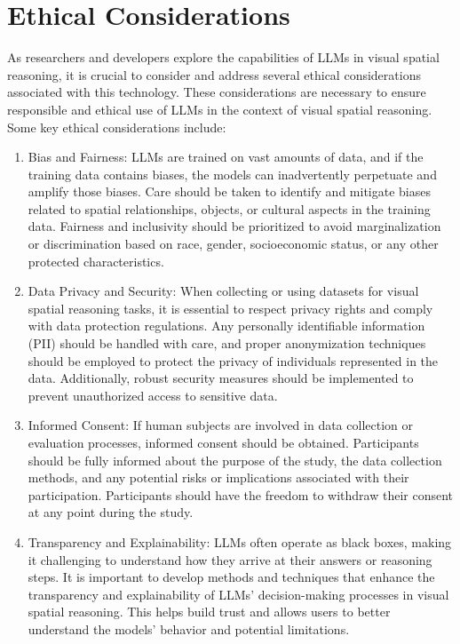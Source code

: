 \documentclass[journal,10pt]{IEEEtran}
\begin{document}
\section{Ethical Considerations}
As researchers and developers explore the capabilities of LLMs in visual spatial reasoning, it is crucial to consider and address several ethical considerations associated with this technology. These considerations are necessary to ensure responsible and ethical use of LLMs in the context of visual spatial reasoning. Some key ethical considerations include:
\begin{enumerate}
    \item Bias and Fairness: LLMs are trained on vast amounts of data, and if the training data contains biases, the models can inadvertently perpetuate and amplify those biases. Care should be taken to identify and mitigate biases related to spatial relationships, objects, or cultural aspects in the training data. Fairness and inclusivity should be prioritized to avoid marginalization or discrimination based on race, gender, socioeconomic status, or any other protected characteristics.
    \item Data Privacy and Security: When collecting or using datasets for visual spatial reasoning tasks, it is essential to respect privacy rights and comply with data protection regulations. Any personally identifiable information (PII) should be handled with care, and proper anonymization techniques should be employed to protect the privacy of individuals represented in the data. Additionally, robust security measures should be implemented to prevent unauthorized access to sensitive data.
    \item Informed Consent: If human subjects are involved in data collection or evaluation processes, informed consent should be obtained. Participants should be fully informed about the purpose of the study, the data collection methods, and any potential risks or implications associated with their participation. Participants should have the freedom to withdraw their consent at any point during the study.
    \item Transparency and Explainability: LLMs often operate as black boxes, making it challenging to understand how they arrive at their answers or reasoning steps. It is important to develop methods and techniques that enhance the transparency and explainability of LLMs' decision-making processes in visual spatial reasoning. This helps build trust and allows users to better understand the models' behavior and potential limitations.

\end{enumerate}
\end{document}
